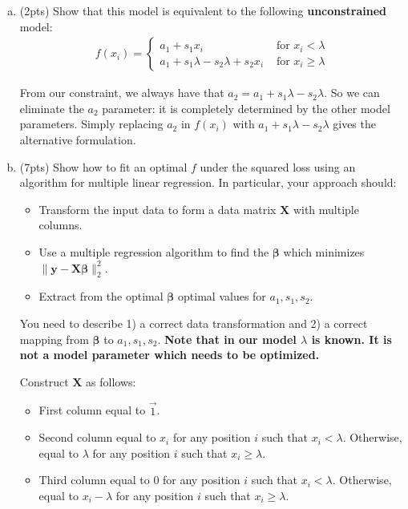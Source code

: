 \documentclass[10pt]{article}
\newcommand{\bs}[1]{\boldsymbol{#1}}
\newcommand{\bv}[1]{\mathbf{#1}}
\begin{document}
\begin{enumerate}[(a)]
	\item (2pts) Show that this model is equivalent to the following \textbf{unconstrained} model:
	\begin{align*}
	f(x_i) = \begin{cases}
		a_1 + s_1x_i & \text{ for $x_i < \lambda$}\\ 
		a_1 + s_1 \lambda - s_2 \lambda + s_2x_i & \text{ for $x_i \geq \lambda$}
	\end{cases}
	\end{align*}
	
	\color{blue}
	From our constraint, we always have that $a_2 = a_1 + s_1\lambda  - s_2\lambda$. So we can eliminate the $a_2$ parameter: it is completely determined by the other model parameters. Simply replacing $a_2$ in $f(x_i)$ with $a_1 + s_1\lambda  - s_2\lambda$ gives the alternative formulation. 
	\color{black}
	
	\item (7pts) Show how to fit an optimal $f$ under the squared loss using an algorithm for multiple linear regression. In particular, your approach should:
	\begin{itemize}
		\item Transform the input data to form a data matrix $\bv{X}$ with multiple columns.
		\item Use a multiple regression algorithm to find the $\bs{\beta}$ which minimizes $\|\bv{y} - \bv{X}\bs{\beta}\|_2^2.$
		\item Extract from the optimal $\bs{\beta}$ optimal values for $a_1, s_1, s_2$. 
	\end{itemize} 
	You need to describe 1) a correct data transformation and 2) a correct mapping from $\bs{\beta}$ to $a_1, s_1, s_2$. 
	\textbf{Note that in our model $\lambda$ is known. It is not a model parameter which needs to be optimized.}
	
	\color{blue}
	Construct $\bv{X}$ as follows:
	\begin{itemize}
		\item First column equal to $\vec{1}$. 
		\item Second column equal to $x_i$ for any position $i$ such that $x_i < \lambda$. Otherwise, equal to $\lambda$ for any position $i$ such that $x_i \geq \lambda$.
		\item Third column equal to $0$ for any position $i$ such that $x_i < \lambda$.  Otherwise, equal to $x_i - \lambda$ for any position $i$ such that $x_i \geq \lambda$.  
	\end{itemize}


\end{enumerate}
\end{document}

